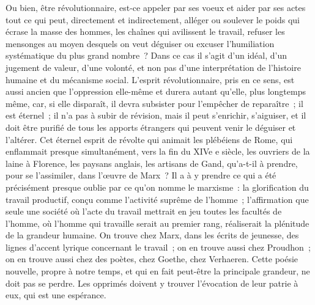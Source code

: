 \documentclass[french,twoside]{book} %
\begin{document}
Ou bien, être révolutionnaire, est-ce appeler par ses voeux et aider par ses actes tout ce qui peut, directement et indirectement, alléger ou soulever le poids qui écrase la masse des hommes, les chaînes qui avilissent le travail, refuser les mensonges au moyen desquels on veut déguiser ou excuser l'humiliation systématique du plus grand nombre ? Dans ce cas il s'agit d'un idéal, d'un jugement de valeur, d'une volonté, et non pas d'une interprétation de l'histoire humaine et du mécanisme social. L'esprit révolutionnaire, pris en ce sens, est aussi ancien que l'oppression elle-même et durera autant qu'elle, plus longtemps même, car, si elle disparaît, il devra subsister pour l'empêcher de reparaître ; il est éternel ; il n'a pas à subir de révision, mais il peut s'enrichir, s'aiguiser, et il doit être purifié de tous les apports étrangers qui peuvent venir le déguiser et l'altérer. Cet éternel esprit de révolte qui animait les plébéiens de Rome, qui enflammait presque simultanément, vers la fin du XIVe e siècle, les ouvriers de la laine à Florence, les paysans anglais, les artisans de Gand, qu'a-t-il à prendre, pour se l'assimiler, dans l'œuvre de Marx ? Il a à y prendre ce qui a été précisément presque oublie par ce qu'on nomme le marxisme : la glorification du travail productif, conçu comme l'activité suprême de l'homme ; l'affirmation que seule une société où l'acte du travail mettrait en jeu toutes les facultés de l'homme, où l'homme qui travaille serait au premier rang, réaliserait la plénitude de la grandeur humaine. On trouve chez Marx, dans les écrits de jeunesse, des lignes d'accent lyrique concernant le travail ; on en trouve aussi chez Proudhon ; on en trouve aussi chez des poètes, chez Goethe, chez Verhaeren. Cette poésie nouvelle, propre à notre temps, et qui en fait peut-être la principale grandeur, ne doit pas se perdre. Les opprimés doivent y trouver l'évocation de leur patrie à eux, qui est une espérance.\par
\end{document}
